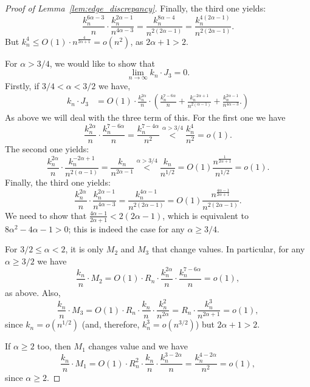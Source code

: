 \begin{proof}[Proof of Lemma~\ref{lem:edge_discrepancy}]
 Finally, the third one yields: 
$$ \frac{k_n^{6\alpha -3}}{n} \cdot \frac{k_n^{2\alpha -1}}{n^{4\alpha - 3}}  
= \frac{k_n^{8\alpha -4}}{n^{2(2\alpha -1)}} = \frac{k_n^{4(2\alpha -1)}}{n^{2(2\alpha-1)}}.$$
But $k_n^4 \leq O(1)\cdot n^{\frac{4}{2\alpha+1}} = o(n^2)$, as $2\alpha +1 >2$.
 
For $\alpha >3/4$, we would like to show that 
\begin{equation} \label{eq:int3_to_prove_II}
\lim_{n \to \infty} k_n \cdot J_3 = 0. 
\end{equation}
Firstly, if $3/4 < \alpha < 3/2$ we have, 
\begin{align*} 
 k_n \cdot J_3 &= O(1) \cdot  
 \frac{k_n^{2\alpha}}{n} \cdot 
\left( 
\frac{k_n^{7-6\alpha}}{n} + \frac{k_n^{-2\alpha +1}}{n^{2(\alpha-1)}} 
+\frac{k_n^{2\alpha -1}}{n^{4\alpha - 3}}.
\right) 
\end{align*}
As above we will deal with the three term of this. 
For the first one we have 
$$  \frac{k_n^{2\alpha}}{n} \cdot 
\frac{k_n^{7-6\alpha}}{n}  = \frac{k_n^{7-4\alpha }}{n^2} \stackrel{\alpha >3/4}{<}  
\frac{k_n^{4}}{n^2} =o(1). 
$$
The second one yields: 
$$\frac{k_n^{2\alpha}}{n} \cdot 
\frac{k_n^{-2\alpha +1}}{n^{2(\alpha-1)}} =
\frac{k_n}{n^{2\alpha-1}} \stackrel{\alpha > 3/4}{<} \frac{k_n}{n^{1/2}} = O(1) 
\frac{n^{\frac{1}{2\alpha+1}}}{n^{1/2}} =o(1).$$
Finally, the third one yields: 
$$  \frac{k_n^{2\alpha}}{n} \cdot \frac{k_n^{2\alpha -1}}{n^{4\alpha - 3}}
= \frac{k_n^{4\alpha -1}}{n^{2(2\alpha -1)}}=
O(1) \frac{n^{\frac{4\alpha-1}{2\alpha+1}}}{n^{2(2\alpha -1)}}.$$
We need to show that $\frac{4\alpha-1}{2\alpha+1}< 2(2\alpha -1)$, which is 
equivalent to $8\alpha^2 - 4 \alpha -1>0$; this is indeed the case for any $\alpha \geq 3/4$. 

 
 For $3/2 \leq \alpha <2$, it is only $M_2$ and $M_3$ that change values. 
 In particular, for any $\alpha \geq 3/2$ we have 
 $$\frac{k_n}{n} \cdot M_2 =O(1)\cdot R_n \cdot \frac{k_n^{2\alpha}}{n} \cdot 
\frac{k_n^{7-6\alpha}}{n} =o(1),$$
as above. 
Also, 
$$ \frac{k_n}{n} \cdot M_3 = O(1)\cdot
R_n \cdot \frac{k_n}{n} \cdot \frac{k_n^{2}}{n^{2\alpha}}
= R_n\cdot  \frac{k_n^{3}}{n^{2\alpha +1}} = o(1),
$$
since $k_n = o(n^{1/2})$ (and, therefore, $k_n^3 = o(n^{3/2})$) but $2\alpha +1 >2$. 

If $\alpha \geq 2$ too, then $M_1$ changes value and we have 
$$\frac{k_n}{n} \cdot M_1 =O(1) \cdot R_n^2 \cdot 
\frac{k_n}{n}  \cdot \frac{k_n^{3-2\alpha}}{n} = \frac{k_n^{4 - 2\alpha}}{n^2}= o(1),$$ 
since $\alpha \geq 2$. 
 

\end{proof}
